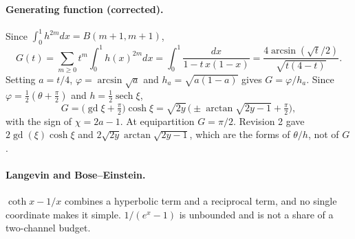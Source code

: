 \documentclass[11pt]{article}
\theoremstyle{definition}
\theoremstyle{remark}
\newcommand{\gd}{\operatorname{gd}}
\newcommand{\sech}{\operatorname{sech}}
\begin{document}
\paragraph{Generating function (corrected).} Since $\int_0^1 h^{2m}dx=B(m+1,m+1)$,
\[
G(t)=\sum_{m\ge0}t^m\!\int_0^1 h(x)^{2m}dx=\int_0^1\frac{dx}{1-t\,x(1-x)}
=\frac{4\arcsin(\sqrt t/2)}{\sqrt{t(4-t)}} .
\]
Setting $a=t/4$, $\varphi=\arcsin\sqrt a$ and $h_a=\sqrt{a(1-a)}$ gives $G=\varphi/h_a$. Since
$\varphi=\tfrac12(\theta+\tfrac\pi2)$ and $h=\tfrac12\sech\xi$,
\[
G=\big(\gd\xi+\tfrac\pi2\big)\cosh\xi=\sqrt{2y}\,\big(\pm\arctan\sqrt{2y-1}+\tfrac\pi2\big),
\]
with the sign of $\chi=2a-1$. At equipartition $G=\pi/2$. Revision 2 gave $2\gd(\xi)\cosh\xi$
and $2\sqrt{2y}\arctan\sqrt{2y-1}$, which are the forms of $\theta/h$, not of $G$.

\paragraph{Langevin and Bose--Einstein.} $\coth x-1/x$ combines a hyperbolic term and a
reciprocal term, and no single coordinate makes it simple. $1/(e^x-1)$ is unbounded and is
not a share of a two-channel budget.



\end{document}
